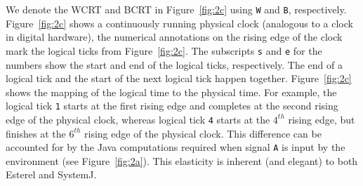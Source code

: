 We denote the WCRT and BCRT in Figure~\ref{fig:2c} using \texttt{W} and
\texttt{B}, respectively. Figure~\ref{fig:2c} shows a continuously
running physical clock (analogous to a clock in digital hardware), the
numerical annotations on the rising edge of the clock mark the logical
ticks from Figure~\ref{fig:2c}. The subscripts \texttt{s} and \texttt{e}
for the numbers show the start and end of the logical ticks,
respectively. The end of a logical tick and the start of the next
logical tick happen together. Figure~\ref{fig:2c} shows the mapping of
the logical time to the physical time. For example, the logical tick
\texttt{1} starts at the first rising edge and completes at the second
rising edge of the physical clock, whereas logical tick \texttt{4}
starts at the $4^{th}$ rising edge, but finishes at the $6^{th}$ rising
edge of the physical clock. This difference can be accounted for by the
Java computations required when signal \texttt{A} is input by the
environment (see Figure~\ref{fig:2a}). This elasticity is inherent (and
elegant) to both Esterel and SystemJ.







